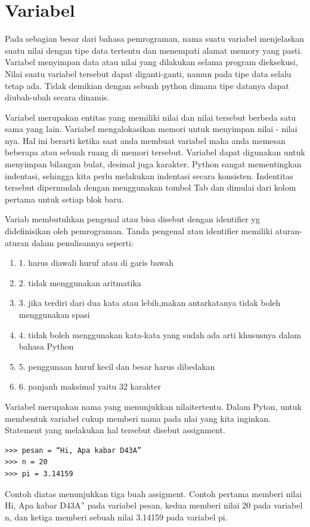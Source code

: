 
\section{Variabel}
Pada sebagian besar dari bahasa pemrograman, nama suatu variabel
menjelaskan suatu nilai dengan tipe data tertentu 
dan menempati alamat memory yang pasti.
Variabel menyimpan data atau nilai yang dilakukan selama program dieksekusi,
Nilai suatu variabel tersebut dapat diganti-ganti, namun pada tipe data selalu tetap ada.
Tidak demikian dengan sebuah python dimana tipe datanya dapat diubah-ubah
secara dinamis\cite{suparno2013komputasi}.

Variabel merupakan entitas yang memiliki nilai dan nilai tersebut berbeda satu sama yang lain. Variabel mengalokasikan memori untuk menyimpan nilai - nilai nya.
Hal ini berarti ketika saat anda membuat variabel maka anda memesan beberapa atau sebuah ruang di memori tersebut. 
Variabel dapat digunakan untuk menyimpan bilangan bulat, desimal juga karakter.
Python sangat mementingkan indentasi, sehingga kita perlu melakukan indentasi secara konsisten. 
Indentitas tersebut dipermudah dengan menggunakan tombol Tab dan dimulai dari kolom pertama untuk setiap blok baru.

Variab membutuhkan pengenal atau bisa disebut dengan identifier yg didefinisikan oleh pemrograman. Tanda pengenal atau identifier memiliki aturan-aturan dalam penulisannya seperti:
\begin{enumerate}
\item
1. harus diawali huruf atau di garis bawah
\item
2. tidak menggunakan aritmatika
\item
3. jika terdiri dari dua kata atau lebih,makan antarkatanya tidak boleh menggunakan spasi
\item
4. tidak boleh menggunakan kata-kata yang sudah ada arti khususnya dalam bahasa Python
\item
5. penggunaan huruf kecil dan besar harus dibedakan
\item
6. panjanh maksimal yaitu 32 karakter
\end{enumerate}

Variabel merupakan nama yang menunjukkan nilaitertentu. Dalam Pyton, untuk membentuk variabel cukup memberi nama pada nlai yang kita inginkan. Statement yang melakukan hal tersebut disebut assignment.
\begin{verbatim}
>>> pesan = “Hi, Apa kabar D43A”
>>> n = 20
>>> pi = 3.14159
\end{verbatim}
Contoh diatas menunjukkan tiga buah assigment. Contoh pertama memberi nilai \“Hi, Apa kabar D43A” pada variabel pesan, kedua memberi nilai 20 pada variabel n, dan ketiga memberi sebuah nilai 3.14159 pada variabel pi.\cite{utami2004logika}

